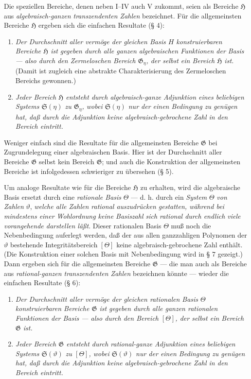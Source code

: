 Die speziellen Bereiche, denen neben I--IV auch V zukommt, seien als Bereiche
$\mathfrak H$ aus \emph{algebraisch-ganzen transzendenten Zahlen} bezeichnet.
Für die allgemeinsten Bereiche $\mathfrak H$ ergeben sich die einfachen
Resultate (§ 4):
\begin{enumerate}
\item[a)] \emph{Der Durchschnitt aller vermöge der gleichen Basis $H$
konstruierbaren Bereiche $\mathfrak H$ ist gegeben durch alle ganzen
algebraischen Funktionen der Basis --- also durch den Zermeloschen Bereich
$\mathfrak G_\eta$, der selbst ein Bereich $\mathfrak H$ ist.} (Damit ist
zugleich eine abstrakte Charakterisierung des Zermeloschen Bereichs gewonnen.)
\item[b)] \emph{Jeder Bereich $\mathfrak H$ entsteht durch algebraisch-ganze
Adjunktion eines beliebigen Systems
$\mathfrak S(\eta)$ zu $\mathfrak G_\eta$, wobei $\mathfrak S(\eta)$ nur der
einen Bedingung zu genügen hat, daß durch die Adjunktion keine
algebraisch-gebrochene Zahl in den Bereich eintritt.}
\end{enumerate}

Weniger einfach sind die Resultate für die allgemeinsten Bereiche $\mathfrak G$
bei Zugrundelegung einer algebraischen Basis. Hier ist der Durchschnitt aller
Bereiche $\mathfrak G$ selbst kein Bereich $\mathfrak G$; und auch die
Konstruktion der allgemeinsten Bereiche ist infolgedessen schwieriger zu
übersehen (§ 5).

Um analoge Resultate wie für die Bereiche $\mathfrak H$ zu erhalten, wird die
algebraische Basis ersetzt durch eine \emph{rationale Basis} $\Theta$ --- d. h.
durch ein \emph{System} $\Theta$ \emph{von Zahlen} $\vartheta$, \emph{welche
alle Zahlen rational auszudrücken gestatten, während bei mindestens einer
Wohlordnung keine Basiszahl sich rational durch endlich viele vorangehende
darstellen läßt}. Dieser rationalen Basis $\Theta$ muß noch die Nebenbedingung
auferlegt werden, daß der aus allen ganzzahligen Polynomen der $\vartheta$
bestehende Integritätsbereich $[\Theta]$ keine algebraisch-gebrochene Zahl
enthält. (Die Konstruktion einer solchen Basis mit Nebenbedingung wird in § 7
gezeigt.) Dann ergeben sich für die allgemeinsten Bereiche $\mathfrak G$ ---
die man auch als Bereiche aus \emph{rational-ganzen transzendenten Zahlen}
bezeichnen könnte --- wieder die einfachen Resultate (§ 6):
\begin{enumerate}
\item[a)] \emph{Der Durchschnitt aller vermöge der gleichen rationalen Basis
$\Theta$ konstruierbaren Bereiche $\mathfrak G$ ist gegeben durch alle ganzen
rationalen Funktionen der Basis --- also durch den Bereich $[\Theta]$, der selbst
ein Bereich $\mathfrak G$ ist.}
\item[b)] \emph{Jeder Bereich $\mathfrak G$ entsteht durch rational-ganze
Adjunktion eines beliebigen Systems $\mathfrak S(\vartheta)$ zu $[\Theta]$,
wobei $\mathfrak S(\vartheta)$ nur der einen Bedingung zu genügen hat, daß durch
die Adjunktion keine algebraisch-gebrochene Zahl in den Bereich eintritt.}
\end{enumerate}

